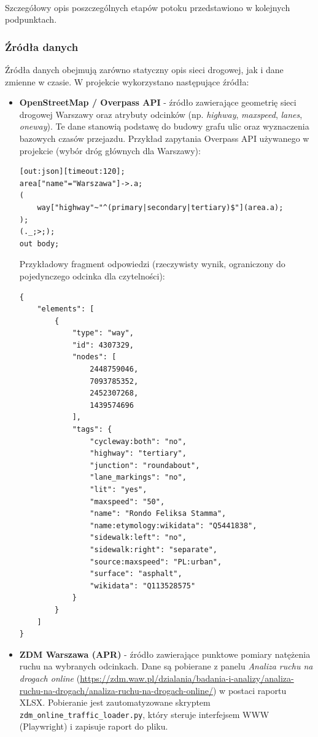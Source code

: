 \documentclass[12pt]{article}
\begin{document}
\noindent \\Szczegółowy opis poszczególnych etapów potoku przedstawiono w kolejnych podpunktach.

\subsubsection{Źródła danych}
Źródła danych obejmują zarówno statyczny opis sieci drogowej, jak i dane zmienne w czasie.
W projekcie wykorzystano następujące źródła:
\begin{itemize}
    \item \textbf{OpenStreetMap / Overpass API} - źródło zawierające geometrię sieci drogowej Warszawy oraz atrybuty
    odcinków (np. \textit{highway}, \textit{maxspeed}, \textit{lanes}, \textit{oneway}). Te dane stanowią
    podstawę do budowy grafu ulic oraz wyznaczenia bazowych czasów przejazdu.
    Przykład zapytania Overpass API używanego w projekcie (wybór dróg głównych dla Warszawy):
\begin{tcolorbox}
\begin{verbatim}
[out:json][timeout:120];
area["name"="Warszawa"]->.a;
(
    way["highway"~"^(primary|secondary|tertiary)$"](area.a);
);
(._;>;);
out body;
\end{verbatim}
\end{tcolorbox}

Przykładowy fragment odpowiedzi (rzeczywisty wynik, ograniczony do pojedynczego odcinka dla czytelności):
\begin{tcolorbox}
\begin{verbatim}
{
    "elements": [
        {
            "type": "way",
            "id": 4307329,
            "nodes": [
                2448759046,
                7093785352,
                2452307268,
                1439574696
            ],
            "tags": {
                "cycleway:both": "no",
                "highway": "tertiary",
                "junction": "roundabout",
                "lane_markings": "no",
                "lit": "yes",
                "maxspeed": "50",
                "name": "Rondo Feliksa Stamma",
                "name:etymology:wikidata": "Q5441838",
                "sidewalk:left": "no",
                "sidewalk:right": "separate",
                "source:maxspeed": "PL:urban",
                "surface": "asphalt",
                "wikidata": "Q113528575"
            }
        }
    ]
}
\end{verbatim}
\end{tcolorbox}

    \item \textbf{ZDM Warszawa (APR)} - źródło zawierające punktowe pomiary natężenia ruchu na wybranych odcinkach.
    Dane są pobierane z panelu \textit{Analiza ruchu na drogach online}
   {\sloppy (\url{https://zdm.waw.pl/dzialania/badania-i-analizy/analiza-ruchu-na-drogach/analiza-ruchu-na-drogach-online/})\fussy}
    w postaci raportu XLSX.
    Pobieranie jest zautomatyzowane skryptem \verb|zdm_online_traffic_loader.py|,
    który steruje interfejsem WWW (Playwright) i zapisuje raport do pliku.
    

\end{itemize}
\end{document}

